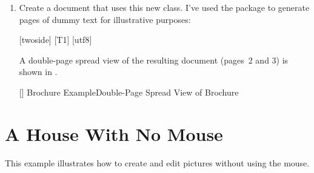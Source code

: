 \begin{enumerate}
\item Create a document that uses this new class. I've used the
 package to generate pages of dummy text for
illustrative purposes:
\begin{codebox}
[twoside]
\codepar
{}[T1]
[utf8]
\codepar
{}
\codepar
{}
\end{codebox}

A double-page spread view of the resulting document (pages~2 and 3)
is shown in .

[]
{}
{Brochure Example\dash Double-Page Spread View of Brochure}

\end{enumerate}

\section{A House With No Mouse}\label{sec:accesstutorial}

This example illustrates how to create and edit pictures without
using the mouse.

